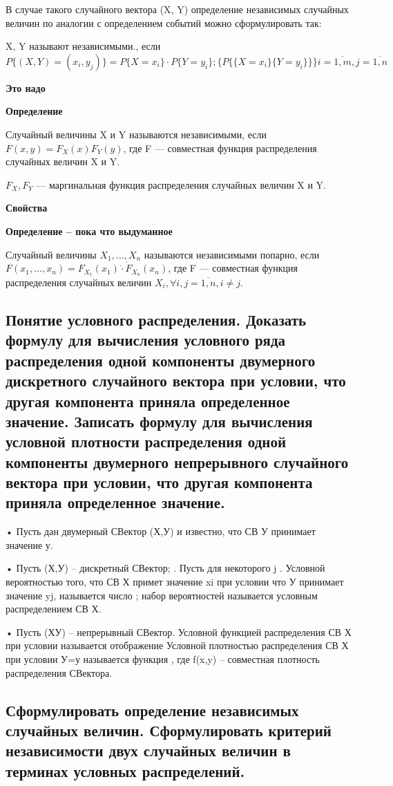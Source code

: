 В случае такого случайного вектора (X, Y) определение независимых случайных величин по аналогии с определением событий можно сформулировать так:

X, Y называют независимыми., если $P\{(X, Y)=(x_i, y_j)\} = P\{X=x_i\} \cdot P\{Y=y_i\}; \{P\{\{X=x_i\}\{Y=y_i\}\}\} i=\overline{1,m}, j=\overline{1,n}$

\textbf{Это надо}

\textbf{Определение}

Случайный величины X и Y называются независимыми, если $F(x, y) = F_X(x)F_Y(y)$, где F --- совместная функция распределения случайных величин X и Y.

$F_X, F_Y$ --- маргинальная функция распределения случайных величин X и Y.

\textbf{Свойства}

\textbf{Определение -- пока что выдуманное}

Случайный величины $X_1, \dots, X_n$ называются независимыми попарно, если $F(x_1, \dots, x_n) = F_{X_1}(x_1) \dot \cdot \dot F_{X_n}(x_n)$, где F --- совместная функция распределения случайных величин $X_i, \forall i,j = \overline{1,n}, i \neq j$.

\subsection{Понятие условного распределения. Доказать формулу для вычисления условного ряда распределения одной компоненты двумерного дискретного случайного вектора при условии, что другая компонента приняла определенное значение. Записать формулу для вычисления условной плотности распределения одной компоненты двумерного непрерывного случайного вектора при условии, что другая компонента приняла определенное значение.}

• Пусть дан двумерный СВектор (Х,У) и известно, что СВ У принимает значение у.

• Пусть (Х,У) – дискретный СВектор; . Пусть для некоторого j . Условной вероятностью того, что СВ Х примет значение xi при условии что У принимает значение yj, называется число ; набор вероятностей  называется условным распределением СВ Х.

• Пусть (ХУ) – непрерывный СВектор. Условной функцией распределения СВ Х при условии  называется отображение  Условной плотностью распределения СВ Х при условии У=у называется функция , где f(x,y) – совместная плотность распределения СВектора.

\subsection{Сформулировать определение независимых случайных величин. Сформулировать критерий независимости двух случайных величин в терминах условных распределений.}


